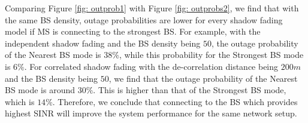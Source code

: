  \par Comparing Figure \ref{fig: outprob1} with Figure \ref{fig: outprobs2}, we find that with the same BS density, outage probabilities are lower for every shadow fading model if MS is connecting to the strongest BS. For example, with the independent shadow fading and the BS density being $50$, the outage probability of the Nearest BS mode is $38\%$, while this probability for the Strongest BS mode is $6\%$. For correlated shadow fading with the de-correlation distance being $200m$ and the BS density being $50$, we find that the outage probability of the Nearest BS mode is around $30\%$. This is higher than that of the Strongest BS mode, which is $14\%$. Therefore, we conclude that connecting to the BS which provides highest SINR will improve the system performance for the same network setup. 









